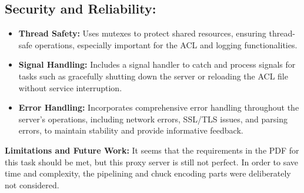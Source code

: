 \documentclass{article}
\begin{document}
\subsection*{Security and Reliability:}
\begin{itemize}
    \item \textbf{Thread Safety:} Uses mutexes to protect shared resources, ensuring thread-safe operations, especially important for the ACL and logging functionalities.
    
    \item \textbf{Signal Handling:} Includes a signal handler to catch and process signals for tasks such as gracefully shutting down the server or reloading the ACL file without service interruption.
    
    \item \textbf{Error Handling:} Incorporates comprehensive error handling throughout the server's operations, including network errors, SSL/TLS issues, and parsing errors, to maintain stability and provide informative feedback.
\end{itemize}

\textbf{Limitations and Future Work:}
It seems that the requirements in the PDF for this task should be met, but this proxy server is still not perfect. In order to save time and complexity, the pipelining and chuck encoding parts were deliberately not considered.
\end{document}
